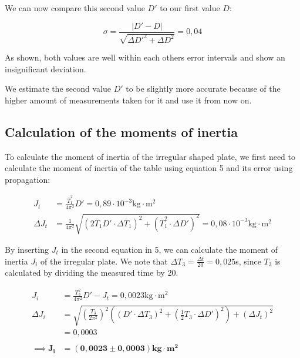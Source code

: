 \documentclass{article}
\begin{document}
We can now compare this second value $D'$ to our first value $D$:

\begin{equation}
    \sigma = \frac{|D'-D|}{\sqrt{\Delta D'^2 + \Delta D^2}} = 0,04
\end{equation}

As shown, both values are well within each others error intervals and show an insignificant deviation.

We estimate the second value $D'$ to be slightly more accurate because of the higher amount of measurements taken for it and use it from now on.

\newpage

\subsection{Calculation of the moments of inertia}

To calculate the moment of inertia of the irregular shaped plate, we first need to calculate the moment of inertia of the table using equation 5 and its error using propagation:

\begin{equation}
    \begin{split}
        J_t &= \frac{\overline{T}_1^2}{4\pi^2} D' = 0,89 \cdot 10^{-3} \text{kg} \cdot \text{m}^2 \\
        \Delta J_t &= \frac{1}{4\pi^2} \sqrt{(2 \overline{T}_1 D' \cdot \Delta \overline{T}_1)^2 + (\overline{T}_1^2 \cdot \Delta D')^2} = 0,08 \cdot 10^{-3} \text{kg} \cdot \text{m}^2 
    \end{split}
\end{equation}

By inserting $J_t$ in the second equation in 5, we can calculate the moment of inertia $J_i$ of the irregular plate. We note that $\Delta T_3 = \frac{\Delta t}{20} = 0,025$s, since $T_3$ is calculated by dividing the measured time by 20.

\begin{equation}
    \begin{split}
        J_i &= \frac{T_3^2}{4\pi^2} D'- J_t = 0,0023 \text{kg} \cdot \text{m}^2 \\
        \Delta J_i &= \sqrt{\left( \frac{T_3}{2\pi^2} \right)^2 \left( \left( D' \cdot \Delta T_3 \right)^2 + \left( \frac{1}{2} T_3 \cdot \Delta D' \right)^2 \right) + \left( \Delta J_t \right)^2} \\
        &= 0,0003 \\ \\
        \implies \bm{J_i} &= \bm{(0,0023 \pm 0,0003) \textbf{kg} \cdot \textbf{m}^2}
    \end{split}
\end{equation}
\end{document}
